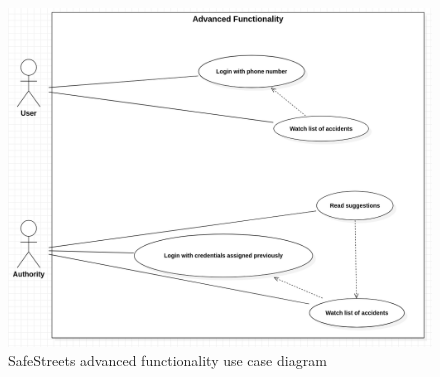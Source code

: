 \begin{figure}[H]
\includegraphics[scale=0.34]{Images/Diagrams/UseCase2.png}
\caption{\label{fig:UseCase2}SafeStreets advanced functionality use case diagram}
\end{figure}

